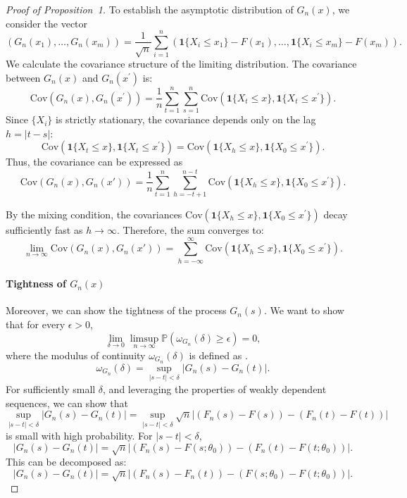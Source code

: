 \documentclass[12pt]{article}
\begin{document}
\begin{proof}[Proof of Proposition~1]
To establish the asymptotic distribution of $ G_n(x) $, we consider the vector 
\[
(G_n(x_1), \ldots, G_n(x_m)) = \frac{1}{\sqrt{n}} \sum_{i=1}^n (\mathbf{1}\{X_i \leq x_1\} - 
F(x_1), \ldots, \mathbf{1}\{X_i \leq x_m\} - F(x_m)).
\]
We calculate the covariance structure of the limiting distribution. The 
covariance between $ G_n(x) $ and $ G_n(x^{\prime}) $ is:
\[
\text{Cov}(G_n(x), G_n(x^{\prime})) = \frac{1}{n} \sum_{t=1}^n \sum_{s=1}^n 
\text{Cov}(\mathbf{1}\{X_t \leq x\}, \mathbf{1}\{X_t \leq x^{\prime}\}).
\]
Since $ \{X_i\} $ is strictly stationary, the covariance depends only on the 
lag $ h = |t-s| $:
\[
\text{Cov}(\mathbf{1}\{X_t \leq x\}, \mathbf{1}\{X_t \leq x^{\prime}\}) = \text{Cov}(\mathbf{1}\{X_h \leq x\}, 
\mathbf{1}\{X_0 \leq x^{\prime}\}).
\]
Thus, the covariance can be expressed as
\[
\text{Cov}(G_n(x), G_n(x')) = \frac{1}{n} \sum_{t=1}^n \sum_{h=-t+1}^{n-t} 
\text{Cov}(\mathbf{1}\{X_h \leq x\}, 
\mathbf{1}\{X_0 \leq x^{\prime}\}).
\]


By the mixing condition, the covariances
$ \text{Cov}(\mathbf{1}\{X_h \leq x\}, \mathbf{1}\{X_0 \leq x^{\prime}\}) $ 
decay sufficiently fast as $ h \to \infty $. Therefore, the sum converges to:
\[
  \lim_{n \to \infty} \text{Cov}(G_n(x), G_n(x'))
  = \sum_{h=-\infty}^{\infty} \text{Cov}(\mathbf{1}\{X_h \leq x\}, 
  \mathbf{1}\{X_0 \leq x^{\prime}\}).
\]


\paragraph{Tightness of $G_n(x)$}

Moreover, we can show the tightness of the process $G_n(s)$. 
We want to show that for every $\epsilon > 0$,
\[
\lim_{\delta \to 0} \limsup_{n \to \infty} \mathbb{P}\left( \omega_{G_n}(\delta) 
\geq \epsilon \right) = 0,
\]
where the modulus of continuity $\omega_{G_n}(\delta)$ is defined as
\citep{billingsley2013convergence}.
\[
\omega_{G_n}(\delta) = \sup_{|s - t| < \delta} |G_n(s) - G_n(t)|.
\]
For sufficiently small $\delta$, and leveraging the properties of weakly 
dependent sequences, we can show that
\[
  \sup_{|s - t| < \delta} |G_n(s) - G_n(t)|
  = \sup_{|s - t| < \delta}  \sqrt{n}|(F_n(s) - F(s)) - (F_n(t) - F(t))|
\]
is small with high probability.
For $ |s - t| < \delta $,
\[
|G_n(s) - G_n(t)| = \sqrt{n} \left| (F_n(s) - F(s; \theta_0)) - (F_n(t) - 
F(t; \theta_0)) \right|.
\]
This can be decomposed as:
\[
|G_n(s) - G_n(t)| = \sqrt{n} \left| (F_n(s) - F_n(t)) - (F(s; \theta_0) - 
F(t; \theta_0)) \right|.
\]



\end{proof}
\end{document}
